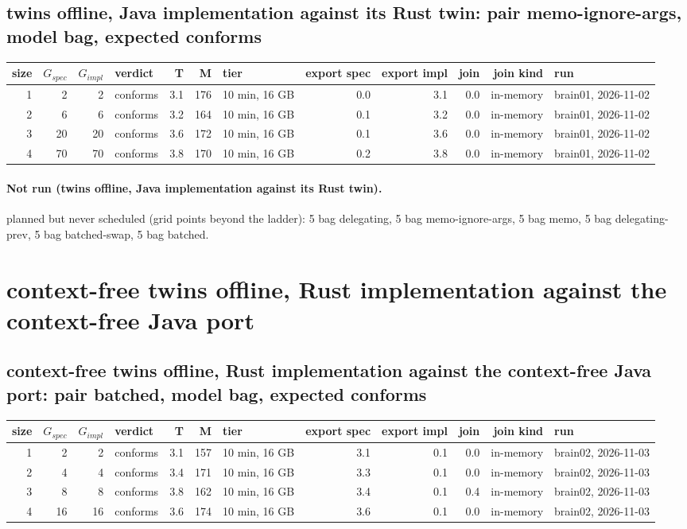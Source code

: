 \documentclass[10pt]{article}
\begin{document}
\subsection*{twins offline, Java implementation against its Rust twin: pair \textsf{memo-ignore-args}, model bag, expected conforms}
\begin{longtable}{@{}rrrlrrlrrrrl@{}}
\toprule
size & $G_{\mathit{spec}}$ & $G_{\mathit{impl}}$ & verdict & T & M & tier & export spec & export impl & join & join kind & run \\
\midrule
\endhead
\color{red} 1 & 2 & 2 & conforms & 3.1 & 176 & 10 min, 16 GB & 0.0 & 3.1 & 0.0 & in-memory & brain01, 2026-11-02 \\
\color{red} 2 & 6 & 6 & conforms & 3.2 & 164 & 10 min, 16 GB & 0.1 & 3.2 & 0.0 & in-memory & brain01, 2026-11-02 \\
\color{red} 3 & 20 & 20 & conforms & 3.6 & 172 & 10 min, 16 GB & 0.1 & 3.6 & 0.0 & in-memory & brain01, 2026-11-02 \\
\color{red} 4 & 70 & 70 & conforms & 3.8 & 170 & 10 min, 16 GB & 0.2 & 3.8 & 0.0 & in-memory & brain01, 2026-11-02 \\
\bottomrule
\end{longtable}
\paragraph{Not run (twins offline, Java implementation against its Rust twin).}
planned but never scheduled (grid points beyond the ladder): 5 bag delegating, 5 bag memo-ignore-args, 5 bag memo, 5 bag delegating-prev, 5 bag batched-swap, 5 bag batched.\par
\section*{context-free twins offline, Rust implementation against the context-free Java port}
\subsection*{context-free twins offline, Rust implementation against the context-free Java port: pair \textsf{batched}, model bag, expected conforms}
\begin{longtable}{@{}rrrlrrlrrrrl@{}}
\toprule
size & $G_{\mathit{spec}}$ & $G_{\mathit{impl}}$ & verdict & T & M & tier & export spec & export impl & join & join kind & run \\
\midrule
\endhead
\color{red} 1 & 2 & 2 & conforms & 3.1 & 157 & 10 min, 16 GB & 3.1 & 0.1 & 0.0 & in-memory & brain02, 2026-11-03 \\
\color{red} 2 & 4 & 4 & conforms & 3.4 & 171 & 10 min, 16 GB & 3.3 & 0.1 & 0.0 & in-memory & brain02, 2026-11-03 \\
\color{red} 3 & 8 & 8 & conforms & 3.8 & 162 & 10 min, 16 GB & 3.4 & 0.1 & 0.4 & in-memory & brain02, 2026-11-03 \\
\color{red} 4 & 16 & 16 & conforms & 3.6 & 174 & 10 min, 16 GB & 3.6 & 0.1 & 0.0 & in-memory & brain02, 2026-11-03 \\
\bottomrule
\end{longtable}
\end{document}
